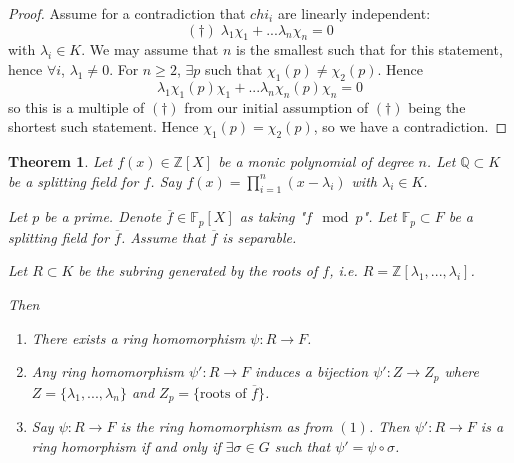 \documentclass{article}
\theoremstyle{definition}
\theoremstyle{plain}%
\newtheorem{thm}{Theorem}[section]
\theoremstyle{remark}
\newcommand{\Q}{\mathbb{Q}}
\newcommand{\Z}{\mathbb{Z}}
\newcommand{\F}{\mathbb{F}}
\begin{document}
\begin{proof}
    Assume for a contradiction that $chi_i$ are linearly independent:
    \[ (\dagger) \; \lambda_1 \chi_1 + ... \lambda_n \chi_n = 0 \]
    with $\lambda_i \in K$. We may assume that $n$ is the smallest such that for this statement, hence $\forall i$, $\lambda_1 \ne 0$. For $n \ge 2$, $\exists p$ such that $\chi_1(p) \ne \chi_2(p)$. Hence
    \[\lambda_1 \chi_1(p) \chi_1 + ... \lambda_n \chi_n(p) \chi_n = 0\]
    so this is a multiple of $(\dagger)$ from our initial assumption of $(\dagger)$ being the shortest such statement. Hence $\chi_1(p) = \chi_2(p)$, so we have a contradiction.
\end{proof}

\begin{thm}
    Let $f(x) \in \Z[X]$ be a monic polynomial of degree $n$. Let $\Q \subset K$ be a splitting field for $f$. Say $f(x) = \prod_{i=1}^n (x-\lambda_i)$ with $\lambda_i \in K$.
    
    Let $p$ be a prime. Denote $\overline{f} \in \F_p[X]$ as taking "$f \mod p$". Let $\F_p \subset F$ be a splitting field for $\overline{f}$. Assume that $\overline{f}$ is separable.
    
    Let $R \subset K$ be the subring generated by the roots of $f$, i.e. $R = \Z[\lambda_1, ..., \lambda_i]$.
    
    Then
    \begin{enumerate}
        \item There exists a ring homomorphism $\psi : R \to F$.
        \item Any ring homomorphism $\psi' : R \to F$ induces a bijection $\psi' : Z \to Z_p$ where $Z = \{\lambda_1, ..., \lambda_n\}$ and $Z_p = \{\text{roots of } \overline{f}\}$.
        \item Say $\psi : R \to F$ is the ring homomorphism as from $(1)$. Then $\psi' : R \to F$ is a ring homorphism if and only if $\exists \sigma \in G$ such that $\psi' = \psi \circ \sigma$.
    \end{enumerate}
\end{thm}
\end{document}
